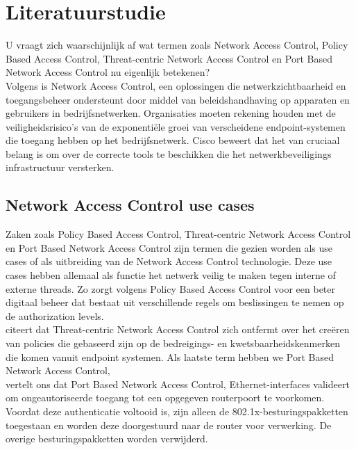 \section{Literatuurstudie}
\label{sec:Literatuurstudie}
U vraagt zich waarschijnlijk af wat termen zoals Network Access Control, Policy Based Access Control, Threat-centric Network Access Control en Port Based Network Access Control nu eigenlijk betekenen?\\Volgens \cite{Cisco} is Network Access Control, een oplossingen die netwerkzichtbaarheid en toegangsbeheer ondersteunt door middel van beleidshandhaving op apparaten en gebruikers in bedrijfsnetwerken. Organisaties moeten rekening houden met de veiligheidsrisico's van de exponentiële groei van verscheidene endpoint-systemen die toegang hebben op het bedrijfsnetwerk. Cisco beweert dat het van cruciaal belang is om over de correcte tools te beschikken die het netwerkbeveiligings infrastructuur versterken.

\subsection{Network Access Control use cases}
Zaken zoals Policy Based Access Control, Threat-centric Network Access Control en Port Based Network Access Control zijn termen die gezien worden als use cases of als uitbreiding van de Network Access Control technologie. Deze use cases hebben allemaal als functie het netwerk veilig te maken tegen interne of externe threads. Zo zorgt volgens \cite{jerichosystems.net} Policy Based Access Control voor een beter digitaal beheer dat bestaat uit verschillende regels om beslissingen te nemen op de authorization levels. \\\cite{TC-NAC} citeert dat Threat-centric Network Access Control zich ontfermt over het creëren van policies die gebaseerd zijn 
op de bedreigings- en kwetsbaarheidskenmerken die komen vanuit endpoint systemen. Als laatste term hebben we Port Based Network Access Control,\\\cite{juniper.net} vertelt ons dat Port Based Network Access Control, Ethernet-interfaces valideert om ongeautoriseerde toegang tot een opgegeven routerpoort te voorkomen. Voordat deze authenticatie voltooid is, zijn alleen de 802.1x-besturingspakketten toegestaan en worden deze doorgestuurd naar de router voor verwerking. De overige besturingspakketten worden verwijderd.



